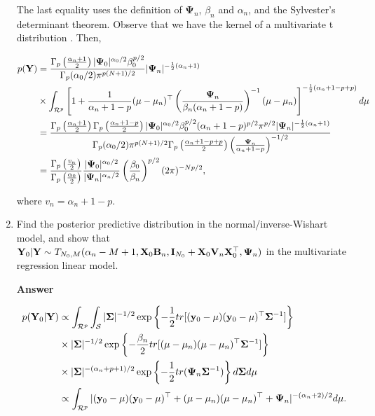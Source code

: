 \begin{enumerate}[leftmargin=*]
The last equality uses the definition of $\mathbf{\Psi}_n$, $\beta_n$ and $\alpha_n$, and the Sylvester's determinant theorem. Observe that we have the kernel of a multivariate t distribution \cite{murphy2007conjugate}. Then,

\begin{align*}
	p({\bf{Y}})	&=\frac{\Gamma_p\left(\frac{\alpha_n+1}{2}\right)|\mathbf{\Psi}_0|^{\alpha_0/2}\beta_0^{p/2}}{\Gamma_p(\alpha_0/2)\pi^{p(N+1)/2}}|\mathbf{\Psi}_n|^{-\frac{1}{2}(\alpha_n+1)}\\
	&\times\int_{\mathcal{R}^p} \left[ 1+\frac{1}{\alpha_n+1-p}(\mu-\mu_n)^{\top}\left(\frac{\mathbf{\Psi}_n}{\beta_n(\alpha_n+1-p)}\right)^{-1}(\mu-\mu_n)\right]^{-\frac{1}{2}(\alpha_n+1-p+p)} d\mu\\
	&=\frac{\Gamma_p\left(\frac{\alpha_n+1}{2}\right)\Gamma_p\left(\frac{\alpha_n+1-p}{2}\right)|\mathbf{\Psi}_0|^{\alpha_0/2}\beta_0^{p/2}(\alpha_n+1-p)^{p/2}\pi^{p/2}|\mathbf{\Psi}_n|^{-\frac{1}{2}(\alpha_n+1)}}{\Gamma_p(\alpha_0/2)\pi^{p(N+1)/2}\Gamma_p\left(\frac{\alpha_n+1-p+p}{2}\right)\left(\frac{\mathbf{\Psi}_n}{\alpha_n+1-p}\right)^{-1/2}}\\
	&=\frac{\Gamma_p\left(\frac{v_n}{2}\right)}{\Gamma_p\left(\frac{\alpha_0}{2}\right)}\frac{|\mathbf{\Psi}_0|^{\alpha_0/2}}{|\mathbf{\Psi}_n|^{\alpha_n/2}}\left(\frac{\beta_0}{\beta_n}\right)^{p/2}(2\pi)^{-Np/2},
\end{align*}

where $v_n=\alpha_n+1-p$.


\item Find the posterior predictive distribution in the normal/inverse-Wishart model, and show that ${\bf{Y}}_0|{\bf{Y}}\sim T_{N_0,M}(\alpha_n-M+1,{\bf{X}}_0{\bf{B}}_n,{\bf{I}}_{N_0}+{\bf{X}}_0{\bf{V}}_n{\bf{X}}_0^{\top},{\bf{\Psi}}_n)$ in the multivariate regression linear model.

\textbf{Answer}

\begin{align*}
	p({\bf{Y}}_0|{\bf{Y}})&\propto\int_{\mathcal{R}^p}\int_{\mathcal{S}}|\mathbf{\Sigma}|^{-1/2}\exp\left\{-\frac{1}{2}tr[({\bf{y}}_0-\mu)({\bf{y}}_0-\mu)^{\top}\mathbf{\Sigma}^{-1}]\right\}\\
	&\times |\mathbf{\Sigma}|^{-1/2}\exp\left\{-\frac{\beta_n}{2}tr[(\mu-\mu_n)(\mu-\mu_n)^{\top}\mathbf{\Sigma}^{-1}]\right\}\\
	&\times |\mathbf{\Sigma}|^{-(\alpha_n+p+1)/2}\exp\left\{-\frac{1}{2}tr(\mathbf{\Psi}_n \mathbf{\Sigma}^{-1})\right\}d\mathbf{\Sigma} d\mu\\
	&\propto\int_{\mathcal{R}^p}|({\bf{y}}_0-\mu)({\bf{y}}_0-\mu)^{\top}+(\mu-\mu_n)(\mu-\mu_n)^{\top}+\mathbf{\Psi}_n|^{-(\alpha_n+2)/2}d\mu.
\end{align*}


\end{enumerate}

